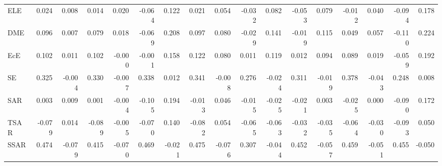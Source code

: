 \begin{tabular}{lrrrrrrrrrrrrrrrr}
ELE & 0.024 & 0.008 & 0.014 & 0.020 & -0.064 & 0.122 & 0.021 & 0.054 & -0.032 & 0.082 & -0.053 & 0.079 & -0.012 & 0.040 & -0.094 & 0.178 \\
DME & 0.096 & 0.007 & 0.079 & 0.018 & -0.069 & 0.208 & 0.097 & 0.080 & -0.029 & 0.141 & -0.019 & 0.115 & 0.049 & 0.057 & -0.110 & 0.224 \\
EcE & 0.102 & 0.011 & 0.102 & -0.000 & -0.001 & 0.158 & 0.122 & 0.080 & 0.011 & 0.119 & 0.012 & 0.094 & 0.089 & 0.019 & -0.059 & 0.192 \\
SE & 0.325 & -0.004 & 0.330 & -0.007 & 0.338 & 0.012 & 0.341 & -0.008 & 0.276 & -0.024 & 0.311 & -0.019 & 0.378 & -0.043 & 0.248 & 0.008 \\
SAR & 0.003 & 0.009 & 0.001 & -0.004 & -0.105 & 0.194 & -0.013 & 0.046 & -0.015 & -0.025 & -0.021 & 0.003 & -0.025 & 0.000 & -0.090 & 0.172 \\
TSAR & -0.079 & 0.014 & -0.089 & -0.005 & -0.070 & 0.140 & -0.082 & 0.054 & -0.065 & -0.063 & -0.032 & -0.035 & -0.064 & -0.030 & -0.093 & 0.050 \\
SSAR & 0.474 & -0.079 & 0.415 & -0.070 & 0.469 & -0.021 & 0.475 & -0.076 & 0.307 & -0.044 & 0.452 & -0.057 & 0.459 & -0.051 & 0.455 & -0.050 \\
\bottomrule
\end{tabular}
